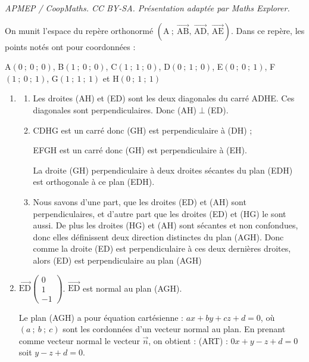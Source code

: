 \documentclass[10pt]{article}
\providecommand{\vect}[1]{\overrightarrow{#1}}
\begin{document}
\noindent\textit{APMEP / CoopMaths. CC BY-SA. Présentation adaptée par Maths Explorer.}\par\medskip
\medskip

On munit l'espace du repère orthonormé $\left(\text{A}~;~\vect{\text{AB}},\, \vect{\text{AD}},\, \vect{\text{AE}}\right)$. Dans ce repère, les points notés ont pour coordonnées :

A$\left(0~;~0~;~0\right)$, B$\left(1~;~0~;~0\right)$, C$\left(1~;~1~;~0\right)$, D$\left(0~;~1~;~0\right)$, E$\left(0~;~0~;~1\right)$, F$\left(1~;~0~;~1\right)$, G$\left(1~;~1~;~1\right)$ et H$\left(0~;~1~;~1\right)$


\begin{enumerate}
	\item 
	\begin{enumerate}
		\item Les droites (AH) et (ED) sont les deux diagonales du carré ADHE. Ces diagonales  sont perpendiculaires. Donc (AH)$\perp$(ED).
		\item CDHG est un carré donc (GH) est perpendiculaire à (DH) ;
		
EFGH est un carré donc (GH) est perpendiculaire à (EH).

La droite (GH) perpendiculaire à deux droites sécantes du plan (EDH) est orthogonale à ce plan (EDH).
		\item Nous savons d'une part, que les droites (ED) et (AH) sont perpendiculaires, et d'autre part que les droites (ED) et (HG) le sont aussi. De plus les droites (HG) et (AH) sont sécantes et non confondues, donc elles définissent deux direction distinctes du plan (AGH). Donc comme la droite (ED) est perpendiculaire à ces deux dernières droites, alors (ED) est perpendiculaire au plan (AGH) 
	\end{enumerate}
		\item $\vect{\text{ED}}\begin{pmatrix}0\\1\\-1\end{pmatrix}$. $\vect{\text{ED}}$ est normal au plan (AGH).
		
		Le plan (AGH) a pour équation cartésienne : $ax+by+cz+d=0$, où $(a~;~b~;~c)$ sont les cordonnées d'un vecteur normal au plan. En prenant comme vecteur normal le vecteur $\vect{n}$, on obtient : (ART) : $0x + y - z + d = 0$ soit $y - z + d = 0$. 


\end{enumerate}
\end{document}

